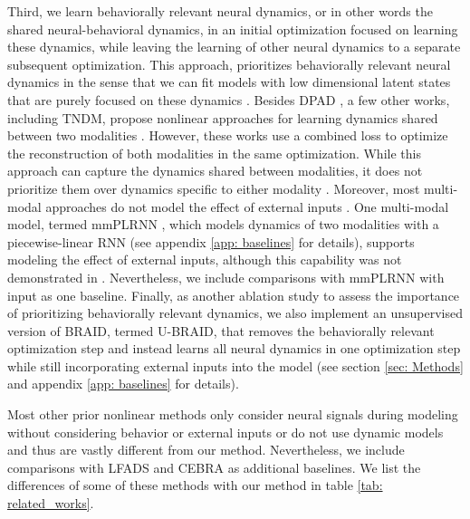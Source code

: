 \documentclass{article} %
\newcommand{\ourmethod}{BRAID}
\newcommand{\ourmethodunsup}{U-\ourmethod}
\begin{document}
Third, we learn behaviorally relevant neural dynamics, or in other words the shared neural-behavioral dynamics, in an initial optimization focused on learning these dynamics, while leaving the learning of other neural dynamics to a separate subsequent optimization. This approach, prioritizes behaviorally relevant neural dynamics in the sense that we can fit models with low dimensional latent states that are purely focused on these dynamics \citep{sani2021modeling}. Besides DPAD \citep{sani2024dissociative}, a few other works, including TNDM, propose nonlinear approaches for learning dynamics shared between two modalities \citep{hurwitz2021targeted, kramer2022, gondur2024multi}. However, these works use a combined loss to optimize the reconstruction of both modalities in the same optimization. While this approach can capture the dynamics shared between modalities, it does not prioritize them over dynamics specific to either modality \citep{sani2024dissociative}. Moreover, most multi-modal approaches do not model the effect of external inputs \citep{hurwitz2021targeted, gondur2024multi}. One multi-modal model, termed mmPLRNN \citep{kramer2022}, which models dynamics of two modalities with a piecewise-linear RNN (see appendix \ref{app: baselines} for details), supports modeling the effect of external inputs, although this capability was not demonstrated in \citet{kramer2022}. Nevertheless, we include comparisons with mmPLRNN with input as one baseline. Finally, as another ablation study to assess the importance of prioritizing behaviorally relevant dynamics, we also implement an unsupervised version of \ourmethod{}, termed \ourmethodunsup{}, that removes the behaviorally relevant optimization step and instead learns all neural dynamics in one optimization step while still incorporating external inputs into the model (see section \ref{sec: Methods} and appendix \ref{app: baselines} for details).

Most other prior nonlinear methods only consider neural signals during modeling without considering behavior or external inputs \citep{gao2016linear, pandarinath2018inferring, hernandez2020, rutten2020non, kim2021inferring} or do not use dynamic models \citep{zhou2020learning, schneider2023learnable} and thus are vastly different from our method. Nevertheless, we include comparisons with LFADS \citep{pandarinath2018inferring} and CEBRA \citep{schneider2023learnable} as additional baselines. We list the differences of some of these methods with our method in table \ref{tab: related_works}.
\end{document}
